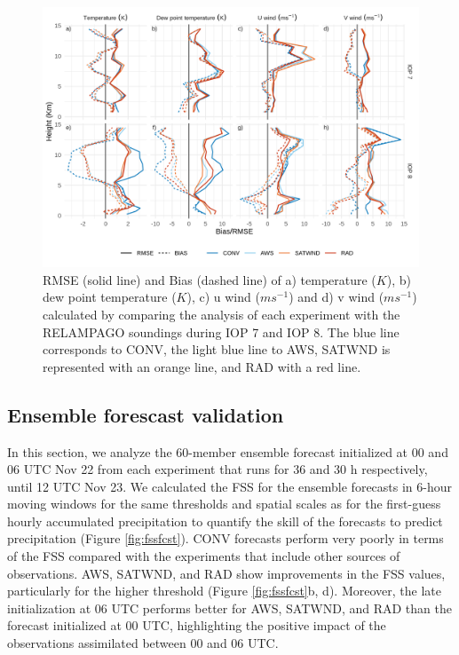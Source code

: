 \documentclass[final,5p,times,twocolumn,authoryear]{elsarticle} %
\begin{document}
\begin{figure}[t]

{\centering \includegraphics{../figures/soundings-1} 

}

\caption{RMSE (solid line) and Bias (dashed line) of a) temperature (\(K\)), b) dew point temperature (\(K\)), c) u wind (\(ms^{-1}\)) and d) v wind (\(ms^{-1}\)) calculated by comparing the analysis of each experiment with the RELAMPAGO soundings during IOP 7 and IOP 8. The blue line corresponds to CONV, the light blue line to AWS, SATWND is represented with an orange line, and RAD with a red line.}\label{fig:soundings}
\end{figure}

\hypertarget{ensemble-forescast-validation}{%
\subsection{Ensemble forescast validation}\label{ensemble-forescast-validation}}

In this section, we analyze the 60-member ensemble forecast initialized at 00 and 06 UTC Nov 22 from each experiment that runs for 36 and 30 h respectively, until 12 UTC Nov 23. We calculated the FSS for the ensemble forecasts in 6-hour moving windows for the same thresholds and spatial scales as for the first-guess hourly accumulated precipitation to quantify the skill of the forecasts to predict precipitation (Figure \ref{fig:fssfcst}). CONV forecasts perform very poorly in terms of the FSS compared with the experiments that include other sources of observations. AWS, SATWND, and RAD show improvements in the FSS values, particularly for the higher threshold (Figure \ref{fig:fssfcst}b, d). Moreover, the late initialization at 06 UTC performs better for AWS, SATWND, and RAD than the forecast initialized at 00 UTC, highlighting the positive impact of the observations assimilated between 00 and 06 UTC.
\end{document}
